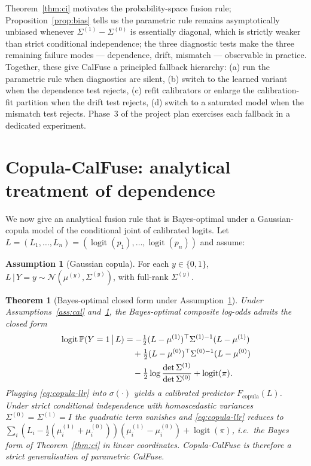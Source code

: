 \documentclass[11pt]{article}
\newtheorem{theorem}{Theorem}
\theoremstyle{definition}
\newtheorem{assumption}{Assumption}
\theoremstyle{remark}
\newcommand{\pr}{\mathbb{P}}
\newcommand{\logit}{\operatorname{logit}}
\newcommand{\given}{\,\big|\,}
\begin{document}
Theorem~\ref{thm:ci} motivates the probability-space fusion rule;
Proposition~\ref{prop:bias} tells us the parametric rule remains
asymptotically unbiased whenever $\Sigma^{(1)} - \Sigma^{(0)}$ is
essentially diagonal, which is strictly weaker than strict conditional
independence; the three diagnostic tests make the three remaining failure
modes — dependence, drift, mismatch — observable in practice. Together,
these give CalFuse a principled fallback hierarchy: (a) run the parametric
rule when diagnostics are silent, (b) switch to the learned variant when
the dependence test rejects, (c) refit calibrators or enlarge the
calibration-fit partition when the drift test rejects, (d) switch to a
saturated model when the mismatch test rejects. Phase~3 of the project
plan exercises each fallback in a dedicated experiment.

\section{Copula-CalFuse: analytical treatment of dependence}

We now give an analytical fusion rule that is Bayes-optimal under a
Gaussian-copula model of the conditional joint of calibrated logits.
Let $L = (L_1, \ldots, L_n) = (\logit(p_1), \ldots, \logit(p_n))$ and
assume:

\begin{assumption}[Gaussian copula]\label{ass:copula}
For each $y \in \{0, 1\}$, $L \given Y = y \sim \mathcal{N}(\mu^{(y)}, \Sigma^{(y)})$,
with full-rank $\Sigma^{(y)}$.
\end{assumption}

\begin{theorem}[Bayes-optimal closed form under Assumption~\ref{ass:copula}]\label{thm:copula}
Under Assumptions~\ref{ass:cal} and~\ref{ass:copula}, the Bayes-optimal
composite log-odds admits the closed form
\begin{align}
\logit \pr(Y = 1 \given L)
  &= -\tfrac{1}{2} (L - \mu^{(1)})^\top \Sigma^{(1)-1} (L - \mu^{(1)}) \notag \\
  &\quad + \tfrac{1}{2} (L - \mu^{(0)})^\top \Sigma^{(0)-1} (L - \mu^{(0)}) \label{eq:copula-llr} \\
  &\quad - \tfrac{1}{2} \log \frac{\det \Sigma^{(1)}}{\det \Sigma^{(0)}} + \logit(\pi). \notag
\end{align}
Plugging \eqref{eq:copula-llr} into $\sigma(\cdot)$ yields a
calibrated predictor $F_{\mathrm{copula}}(L)$. Under strict
conditional independence with homoscedastic variances
$\Sigma^{(0)} = \Sigma^{(1)} = I$ the quadratic term vanishes and
\eqref{eq:copula-llr} reduces to
$\sum_i (L_i - \tfrac{1}{2}(\mu^{(1)}_i + \mu^{(0)}_i))(\mu^{(1)}_i - \mu^{(0)}_i) + \logit(\pi)$,
i.e.\ the Bayes form of Theorem~\ref{thm:ci} in linear coordinates.
Copula-CalFuse is therefore a \emph{strict generalisation} of
parametric CalFuse.
\end{theorem}
\end{document}
